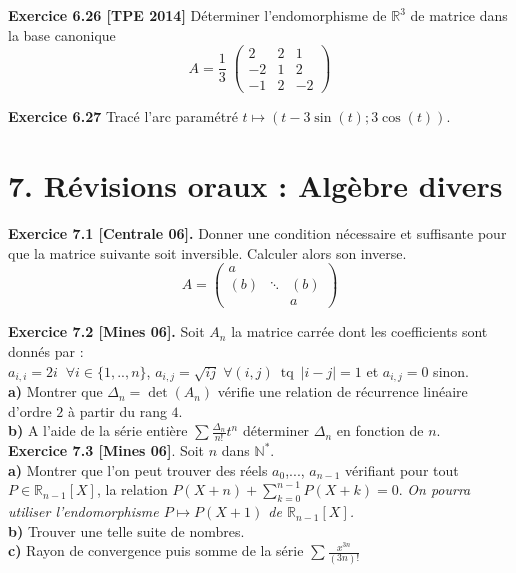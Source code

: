 \documentclass[a4paper,12pt,francais]{article}
\newcommand{\field}[1]{\mathbb{#1}}
\newcommand{\N}{\field{N}}
\newcommand{\R}{\field{R}}
\begin{document}
\noindent
{\bf Exercice 6.26 [TPE 2014]} Déterminer l'endomorphisme de $\R^3$ de matrice dans la base canonique 
$$A= \frac{1}{3}\; 
\left({ \begin{array}{ccc}
2&2&1\\
-2&1&2\\
-1&2&-2
\end{array} }\right)
$$

\noindent
{\bf Exercice 6.27} Tracé l'arc paramétré $t \mapsto (t-3 \sin(t);3 \cos(t))$.\\


\newpage
\section*{7. Révisions oraux : Algèbre divers} %

\noindent
{\bf Exercice 7.1 [Centrale 06].} Donner une condition nécessaire et
suffisante pour que la matrice suivante soit inversible. Calculer
alors son inverse.
$$A=\left(
\begin{array}{ccc}
a&&\\
(b)&\ddots&(b)\\
&&a
\end{array}
\right)$$

\noindent
{\bf Exercice 7.2 [Mines 06].} Soit $A_n$ la matrice carrée dont les
coefficients sont donnés par :\\
$a_{i,i}=2i \; \; \forall i \in
\{1,..,n\}$, $a_{i,j}=\sqrt{ij} \; \forall (i,j) \,\mbox{ tq } \,
|i-j|=1$ et $a_{i,j}=0$ sinon.\\
{\bf a)} Montrer que $\Delta_n=\det(A_n)$ vérifie une relation de
récurrence linéaire d'ordre $2$ à partir du rang $4$.\\
{\bf b)} A l'aide de la série entière $\displaystyle \sum \frac{\Delta_n}{n!} t^n$
déterminer $\Delta_n$ en fonction de $n$.\\

\noindent
{\bf Exercice 7.3 [Mines 06]}. Soit $n$ dans $\N^*$.\\
{\bf a)} Montrer que l'on peut trouver des réels $a_0$,..., $a_{n-1}$
vérifiant pour tout $P\in \R_{n-1}[X]$, la relation $\displaystyle
P(X+n)+\sum_{k=0}^{n-1}P(X+k)=0.$ {\it On pourra utiliser
  l'endomorphisme $P \mapsto P(X+1)$ de $\R_{n-1}[X]$.}\\
{\bf b)} Trouver une telle suite de nombres.\\
{\bf c)} Rayon de convergence puis somme de la série $\sum
\frac{x^{3n}}{(3n)!}$\\
\end{document}
